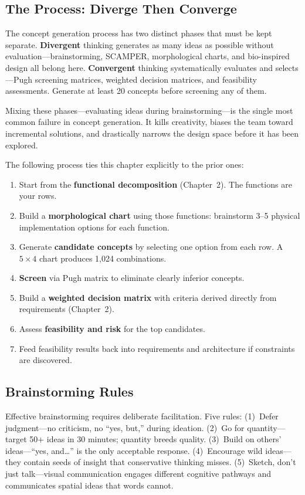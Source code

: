 \documentclass[11pt,letterpaper,twoside,openany]{book}
\begin{document}
\subsection{The Process: Diverge Then Converge}
The concept generation process has two distinct phases that must be kept separate. \textbf{Divergent} thinking generates as many ideas as possible without evaluation---brainstorming, SCAMPER, morphological charts, and bio-inspired design all belong here. \textbf{Convergent} thinking systematically evaluates and selects---Pugh screening matrices, weighted decision matrices, and feasibility assessments. Generate at least 20 concepts before screening any of them.

Mixing these phases---evaluating ideas during brainstorming---is the single most common failure in concept generation. It kills creativity, biases the team toward incremental solutions, and drastically narrows the design space before it has been explored.

The following process ties this chapter explicitly to the prior ones:
\begin{enumerate}[leftmargin=1.5em]
\item Start from the \textbf{functional decomposition} (Chapter~2). The functions are your rows.
\item Build a \textbf{morphological chart} using those functions: brainstorm 3--5 physical implementation options for each function.
\item Generate \textbf{candidate concepts} by selecting one option from each row. A $5 \times 4$ chart produces 1,024 combinations.
\item \textbf{Screen} via Pugh matrix to eliminate clearly inferior concepts.
\item Build a \textbf{weighted decision matrix} with criteria derived directly from requirements (Chapter~2).
\item Assess \textbf{feasibility and risk} for the top candidates.
\item Feed feasibility results back into requirements and architecture if constraints are discovered.
\end{enumerate}

\subsection{Brainstorming Rules}
Effective brainstorming requires deliberate facilitation. Five rules: (1)~Defer judgment---no criticism, no ``yes, but,'' during ideation. (2)~Go for quantity---target 50+ ideas in 30 minutes; quantity breeds quality. (3)~Build on others' ideas---``yes, and\ldots'' is the only acceptable response. (4)~Encourage wild ideas---they contain seeds of insight that conservative thinking misses. (5)~Sketch, don't just talk---visual communication engages different cognitive pathways and communicates spatial ideas that words cannot.
\end{document}

